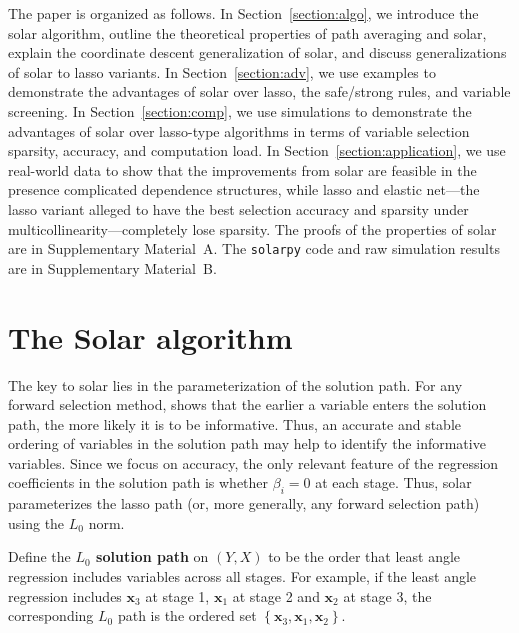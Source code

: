 \documentclass[11pt,review,authoryear]{elsarticle}
\begin{document}
The paper is organized as follows. In Section~\ref{section:algo}, we introduce the solar algorithm, outline the theoretical properties of path averaging and solar, explain the coordinate descent generalization of solar, and discuss generalizations of solar to lasso variants. In Section~\ref{section:adv}, we use examples to demonstrate the advantages of solar over lasso, the safe/strong rules, and variable screening. In Section~\ref{section:comp}, we use simulations to demonstrate the advantages of solar over lasso-type algorithms in terms of variable selection sparsity, accuracy, and computation load. In Section~\ref{section:application}, we use real-world data to show that the improvements from solar are feasible in the presence complicated dependence structures, while lasso and elastic net---the lasso variant alleged \citep{zou2005regularization, jia2010model} to have the best selection accuracy and sparsity under multicollinearity---completely lose sparsity. The proofs of the properties of solar are in Supplementary Material~A. The \texttt{solarpy} code and raw simulation results are in Supplementary Material~B.


\section{The Solar algorithm \label{section:algo}}

The key to solar lies in the parameterization of the solution path. For any forward selection method, \citet[Theorem~2]{zhang09} shows that the earlier a variable enters the solution path, the more likely it is to be informative. Thus, an accurate and stable ordering of variables in the solution path may help to identify the informative variables. Since we focus on accuracy, the only relevant feature of the regression coefficients in the solution path is whether $\beta_i = 0$ at each stage. Thus, solar parameterizes the lasso path (or, more generally, any forward selection path) using the $L_0$ norm.
%
\begin{definition}
  Define the \textbf{$L_0$ solution path} on $\left( Y, X \right)$ to be the order that least angle regression includes variables across all stages. For example, if the least angle regression includes $\mathbf{x}_3$ at stage 1, $\mathbf{x}_1$ at stage 2 and $\mathbf{x}_2$ at stage 3, the corresponding $L_0$ path is the ordered set $\left\{ \mathbf{x}_3, \mathbf{x}_1, \mathbf{x}_2 \right\}$.
  \label{def:solution_path}
\end{definition}
\end{document}
